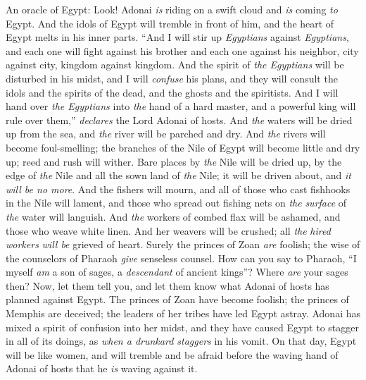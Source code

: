 \begin{biblechapter} %
 An oracle of Egypt:
\verse Look! Adonai \textit{is} riding on a swift cloud 
and \textit{is} coming \textit{to} Egypt. 
And the idols of Egypt will tremble in front of him, 
and the heart of Egypt melts in his inner parts.
\verse “And I will stir up \textit{Egyptians} against \textit{Egyptians}, 
and each one will fight against his brother 
and each one against his neighbor, 
city against city, kingdom against kingdom.
\verse And the spirit of \textit{the Egyptians} will be disturbed in his midst, 
and I will \textit{confuse} his plans, 
and they will consult the idols and the spirits of the dead, 
and the ghosts and the spiritists.
\verse And I will hand over \textit{the Egyptians} into \textit{the} hand of a hard master, 
and a powerful king will rule over them,” 
\textit{declares} the Lord Adonai of hosts.
\verse And \textit{the} waters will be dried up from the sea, 
and \textit{the} river will be parched and dry.
\verse And \textit{the} rivers will become foul-smelling; 
the branches of the Nile of Egypt will become little and dry up; 
reed and rush will wither.
\verse Bare places by \textit{the} Nile will be dried up, 
by the edge of \textit{the} Nile and all the sown land of \textit{the} Nile; 
it will be driven about, and \textit{it will be no more}.
\verse And the fishers will mourn, 
and all of those who cast fishhooks in the Nile will lament, 
and those who spread out fishing nets on \textit{the} \textit{surface} of \textit{the} water will languish.
\verse And \textit{the} workers of combed flax will be ashamed, 
and those who weave white linen.
\verse And her weavers will be crushed; 
all \textit{the} \textit{hired workers} \textit{will be} grieved of heart.
\verse Surely the princes of Zoan \textit{are} foolish; 
the wise of the counselors of Pharaoh \textit{give} senseless counsel. 
How can you say to Pharaoh, 
“I myself \textit{am} a son of sages, 
a \textit{descendant} of ancient kings”?
\verse Where \textit{are} your sages then? 
Now, let them tell you, 
and let them know what Adonai of hosts has planned against Egypt.
\verse The princes of Zoan have become foolish; 
the princes of Memphis are deceived; 
the leaders of her tribes have led Egypt astray.
\verse Adonai has mixed a spirit of confusion into her midst, 
and they have caused Egypt to stagger in all of its doings, 
as \textit{when a drunkard staggers} in his vomit.
 On that day, Egypt will be like women, and will tremble and be afraid before the waving hand of Adonai of hosts that he \textit{is} waving against it.

\end{biblechapter}
